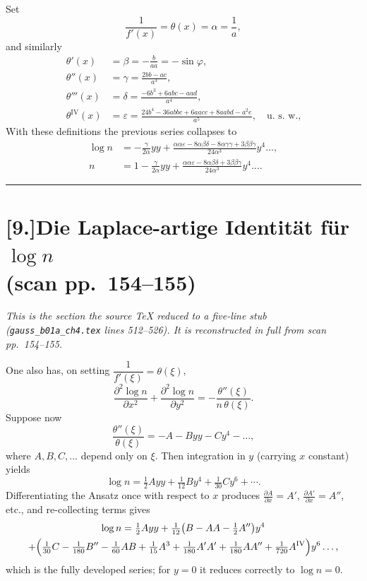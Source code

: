 \documentclass[12pt,a4paper]{article}
\begin{document}
Set
\[
   \frac{1}{f'(x)} = \theta(x) = \alpha = \frac{1}{a},
\]
and similarly
\begin{align*}
   \theta'(x) &= \beta = -\frac{b}{aa} = -\sin\varphi,\\[2pt]
   \theta''(x) &= \gamma = \frac{2bb-ac}{a^{3}},\\[2pt]
   \theta'''(x) &= \delta = \frac{-6b^{3}+6abc-aad}{a^{4}},\\[2pt]
   \theta^{\mathrm{IV}}(x) &= \varepsilon
      = \frac{24b^{4}-36abbc+6aacc+8aabd-a^{2}e}{a^{5}},
   \quad\text{u.~s.~w.,}
\end{align*}
With these definitions the previous series collapses to
\begin{align*}
   \log n &= -\frac{\gamma}{2\alpha}yy
      + \frac{\alpha\alpha\varepsilon - 8\alpha\beta\delta
              - 8\alpha\gamma\gamma + 3\beta\beta\gamma}{24\alpha^{3}}y^{4}\ldots,\\[2pt]
   n &= 1 - \frac{\gamma}{2\alpha}yy
      + \frac{\alpha\alpha\varepsilon - 8\alpha\beta\delta
              + 3\beta\beta\gamma}{24\alpha^{3}}y^{4}\ldots.
\end{align*}

\bigskip
\hrule
\bigskip

\section*{[9.]\quad Die Laplace-artige Identit\"at f\"ur $\log n$\\(scan pp.~154--155)}

\textit{This is the section the source TeX reduced to a five-line stub
(\texttt{gauss\_b01a\_ch4.tex} lines 512--526). It is reconstructed in
full from scan pp.~154--155.}

One also has, on setting $\dfrac{1}{f'(\xi)}=\theta(\xi)$,
\[
   \frac{\partial^{2}\log n}{\partial x^{2}}
     + \frac{\partial^{2}\log n}{\partial y^{2}}
     = -\frac{\theta''(\xi)}{n\,\theta(\xi)}.
\]
Suppose now
\[
   \frac{\theta''(\xi)}{\theta(\xi)}
     = -A - Byy - Cy^{4} - \ldots,
\]
where $A,B,C,\ldots$ depend only on $\xi$. Then integration in $y$
(carrying $x$ constant) yields
\[
   \log n = \tfrac{1}{2}Ayy + \tfrac{1}{12}By^{4} + \tfrac{1}{30}Cy^{6} + \cdots.
\]
Differentiating the Ansatz once with respect to $x$ produces
$\frac{\partial A}{\partial x}=A'$, $\frac{\partial A'}{\partial x}=A''$,
etc., and re-collecting terms gives
\begin{multline*}
   \log n = \tfrac{1}{2}Ayy
      + \tfrac{1}{12}\bigl(B - AA - \tfrac{1}{2}A''\bigr)y^{4}\\
      + \Bigl(\tfrac{1}{30}C - \tfrac{1}{180}B''
             - \tfrac{1}{60}AB + \tfrac{1}{15}A^{3}
             + \tfrac{1}{180}A'A'
             + \tfrac{1}{180}AA''
             + \tfrac{1}{720}A^{\mathrm{IV}}\Bigr)y^{6}\ldots,
\end{multline*}
which is the fully developed series; for $y=0$ it reduces correctly to
$\log n=0$.
\end{document}
